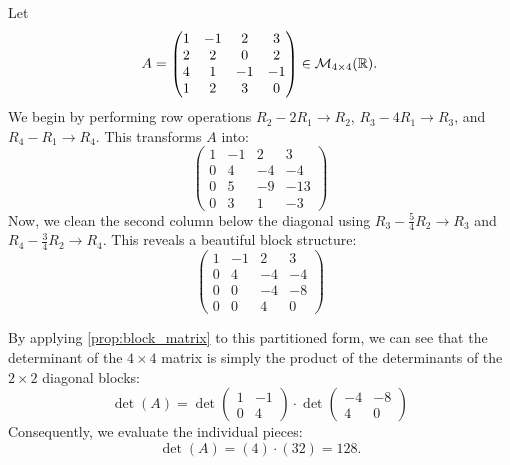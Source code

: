 \begin{example}
  Let
  \[
  A = \begin{pmatrix} 1 & -1 & 2 & 3 \\ 2 & 2 & 0 & 2 \\ 4 & 1 & -1 & -1 \\ 1 & 2 & 3 & 0 \end{pmatrix} \in \mathcal{M}_{4 \times 4}(\mathbb{R}).
  \]
  We begin by performing row operations $R_2 - 2R_1 \to R_2$, $R_3 - 4R_1 \to R_3$, and $R_4 - R_1 \to R_4$. This transforms $A$ into:
  \[
  \begin{pmatrix}
    1 & -1 & 2 & 3 \\
    0 & 4 & -4 & -4 \\
    0 & 5 & -9 & -13 \\
    0 & 3 & 1 & -3
  \end{pmatrix}
  \]
  Now, we clean the second column below the diagonal using $R_3 - \frac{5}{4}R_2 \to R_3$ and $R_4 - \frac{3}{4}R_2 \to R_4$. This reveals a beautiful block structure:
  \[
  \left(
  \begin{array}{cc|cc}
    1 & -1 & 2 & 3 \\
    0 & 4 & -4 & -4 \\ \hline
    0 & 0 & -4 & -8 \\
    0 & 0 & 4 & 0
  \end{array}
  \right)
  \]

  By applying \cref{prop:block_matrix} to this partitioned form, we can see that the determinant of the $4 \times 4$ matrix is simply the product of the determinants of the $2 \times 2$ diagonal blocks:
  \[
  \det(A) = \det \begin{pmatrix} 1 & -1 \\ 0 & 4 \end{pmatrix} \cdot \det \begin{pmatrix} -4 & -8 \\ 4 & 0 \end{pmatrix}
  \]
  Consequently, we evaluate the individual pieces:
  \[
  \det(A) = (4) \cdot (32) = 128.
  \]
\end{example}

